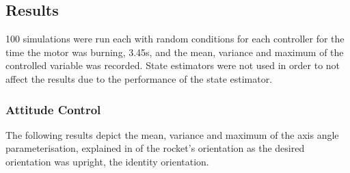 \subsection{Results}
100 simulations were run each with random conditions for each controller for the time the motor was burning, 3.45s, and the mean, variance and maximum of the controlled variable was recorded.
State estimators were not used in order to not affect the results due to the performance of the state estimator.

\subsubsection{Attitude Control}
The following results depict the mean, variance and maximum of the axis angle parameterisation, explained in  of the rocket's orientation as the desired orientation was upright, the identity orientation.

